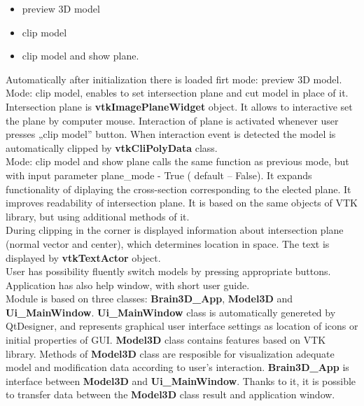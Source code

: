 \begin{itemize}
\item preview 3D model
\item clip model 
\item clip model and show plane.
\end{itemize}
\indent Automatically after initialization there is loaded firt mode: preview 3D model. 
Mode: clip model, enables to set intersection plane and cut model in place of it. Intersection plane is \textbf{vtkImagePlaneWidget} object. It allows to interactive set the plane by computer mouse. Interaction of plane is activated whenever user presses „clip model” button. When interaction event is detected the model is automatically clipped by \textbf{vtkCliPolyData} class. \\
\indent Mode:  clip model and show plane calls the same function as previous mode, but with input parameter plane\_mode - True ( default – False). It expands functionality of diplaying the cross-section corresponding to the elected plane. It improves readability of intersection plane. It is based on the same objects of VTK library, but using additional methods of it.\\
\indent During clipping in the corner is displayed information about intersection plane (normal vector and center), which determines location in space. The text is displayed by \textbf{vtkTextActor} object.\\
\indent User has possibility fluently switch models by pressing appropriate buttons. Application has also help window, with short user guide. \\
\indent Module is based on three classes: \textbf{Brain3D\_App}, \textbf{Model3D} and \textbf{Ui\_MainWindow}. \textbf{Ui\_MainWindow} class is automatically genereted by QtDesigner, and represents graphical user interface settings as location of icons or initial properties of GUI. \textbf{Model3D} class contains features based on VTK library. Methods of \textbf{Model3D} class are resposible for visualization adequate model and modification data according to user's interaction. \textbf{Brain3D\_App} is interface between \textbf{Model3D} and \textbf{Ui\_MainWindow}. Thanks to it, it is possible to transfer data between the \textbf{Model3D} class result and application window.

